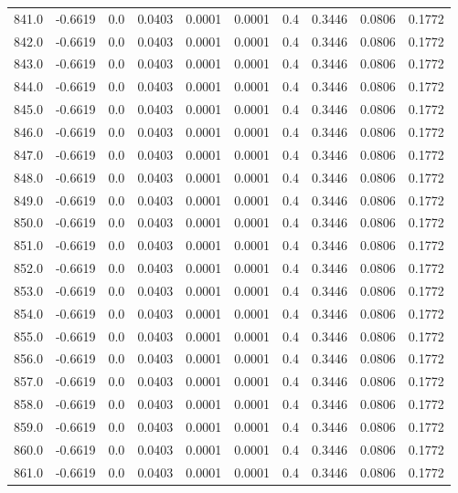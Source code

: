 \begin{longtable}{lrrrrrrrrr}
841.0 & -0.6619 & 0.0 & 0.0403 & 0.0001 & 0.0001 & 0.4 & 0.3446 & 0.0806 & 0.1772 \\
842.0 & -0.6619 & 0.0 & 0.0403 & 0.0001 & 0.0001 & 0.4 & 0.3446 & 0.0806 & 0.1772 \\
843.0 & -0.6619 & 0.0 & 0.0403 & 0.0001 & 0.0001 & 0.4 & 0.3446 & 0.0806 & 0.1772 \\
844.0 & -0.6619 & 0.0 & 0.0403 & 0.0001 & 0.0001 & 0.4 & 0.3446 & 0.0806 & 0.1772 \\
845.0 & -0.6619 & 0.0 & 0.0403 & 0.0001 & 0.0001 & 0.4 & 0.3446 & 0.0806 & 0.1772 \\
846.0 & -0.6619 & 0.0 & 0.0403 & 0.0001 & 0.0001 & 0.4 & 0.3446 & 0.0806 & 0.1772 \\
847.0 & -0.6619 & 0.0 & 0.0403 & 0.0001 & 0.0001 & 0.4 & 0.3446 & 0.0806 & 0.1772 \\
848.0 & -0.6619 & 0.0 & 0.0403 & 0.0001 & 0.0001 & 0.4 & 0.3446 & 0.0806 & 0.1772 \\
849.0 & -0.6619 & 0.0 & 0.0403 & 0.0001 & 0.0001 & 0.4 & 0.3446 & 0.0806 & 0.1772 \\
850.0 & -0.6619 & 0.0 & 0.0403 & 0.0001 & 0.0001 & 0.4 & 0.3446 & 0.0806 & 0.1772 \\
851.0 & -0.6619 & 0.0 & 0.0403 & 0.0001 & 0.0001 & 0.4 & 0.3446 & 0.0806 & 0.1772 \\
852.0 & -0.6619 & 0.0 & 0.0403 & 0.0001 & 0.0001 & 0.4 & 0.3446 & 0.0806 & 0.1772 \\
853.0 & -0.6619 & 0.0 & 0.0403 & 0.0001 & 0.0001 & 0.4 & 0.3446 & 0.0806 & 0.1772 \\
854.0 & -0.6619 & 0.0 & 0.0403 & 0.0001 & 0.0001 & 0.4 & 0.3446 & 0.0806 & 0.1772 \\
855.0 & -0.6619 & 0.0 & 0.0403 & 0.0001 & 0.0001 & 0.4 & 0.3446 & 0.0806 & 0.1772 \\
856.0 & -0.6619 & 0.0 & 0.0403 & 0.0001 & 0.0001 & 0.4 & 0.3446 & 0.0806 & 0.1772 \\
857.0 & -0.6619 & 0.0 & 0.0403 & 0.0001 & 0.0001 & 0.4 & 0.3446 & 0.0806 & 0.1772 \\
858.0 & -0.6619 & 0.0 & 0.0403 & 0.0001 & 0.0001 & 0.4 & 0.3446 & 0.0806 & 0.1772 \\
859.0 & -0.6619 & 0.0 & 0.0403 & 0.0001 & 0.0001 & 0.4 & 0.3446 & 0.0806 & 0.1772 \\
860.0 & -0.6619 & 0.0 & 0.0403 & 0.0001 & 0.0001 & 0.4 & 0.3446 & 0.0806 & 0.1772 \\
861.0 & -0.6619 & 0.0 & 0.0403 & 0.0001 & 0.0001 & 0.4 & 0.3446 & 0.0806 & 0.1772 \\

\end{longtable}
